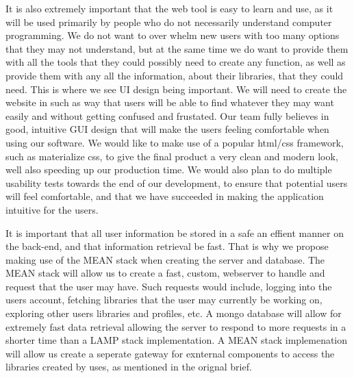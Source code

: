 \documentclass{article}
\begin{document}
    It is also extremely important that the web tool is easy to learn and use, as it will be used primarily by people who do not necessarily
    understand computer programming. We do not want to over whelm new users with too many options that they may not understand, but at the 
    same time we do want to provide them with all the tools that they could possibly need to create any function, as well as provide them 
    with any all the information, about their libraries, that they could need. This is where we see UI design being important. We will need 
    to create the website in such as way that users will be able to find whatever they may want easily and without getting confused and 
    frustated. Our team fully believes in good, intuitive GUI design that will make the users feeling comfortable when using our software.
    We would like to make use of a popular html/css framework, such as materialize css, to give the final product a very clean and modern look,
    well also speeding up our production time. We would also plan to do multiple usability tests towards the end of our development, to ensure
    that potential users will feel comfortable, and that we have succeeded in making the application intuitive for the users. \par

    It is important that all user information be stored in a safe an effient manner on the back-end, and that information retrieval be fast. 
    That is why we propose making use of the MEAN stack when creating the server and database. The MEAN stack will allow us to create a fast, 
    custom, webserver to handle and request that the user may have. Such requests would include, logging into the users account, fetching 
    libraries that the user may currently be working on, exploring other users libraries and profiles, etc. A mongo database will allow for 
    extremely fast data retrieval allowing the server to respond to more requests in a shorter time than a LAMP stack implementation. A MEAN 
    stack implemenation will allow us create a seperate gateway for exnternal components to access the libraries created by uses, as mentioned
    in the orignal brief.\par
\end{document}
